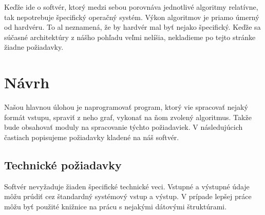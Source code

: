 Keďže ide o softvér, ktorý medzi sebou porovnáva jednotlivé algoritmy 
relatívne, tak nepotrebuje špecifický operačný systém. Výkon algoritmov je 
priamo úmerný od hardvéru. To al neznamená, že by hardvér mal byť nejako 
špecifický. Keďže sa súčasné architektúry z nášho pohľadu veľmi nelíšia, 
nekladieme po tejto stránke žiadne požiadavky.



\section{Návrh}

Našou hlavnou úlohou je naprogramovať program, ktorý vie spracovať nejaký 
formát vstupu, spraviť z neho graf, vykonať na ňom zvolený algoritmus. Takže 
bude obsahovať moduly na spracovanie týchto požiadaviek. V následujúcich 
častiach popisujeme požiadavky kladené na náš softvér.



\subsection{Technické požiadavky}

Softvér nevyžaduje žiaden špecifické technické veci. Vstupné a výstupné údaje 
môžu prúdiť cez štandardný systémový vstup a výstup. V prípade lepšej práce 
môžu byť použité knižnice na prácu s nejakými dátovými štruktúrami.

